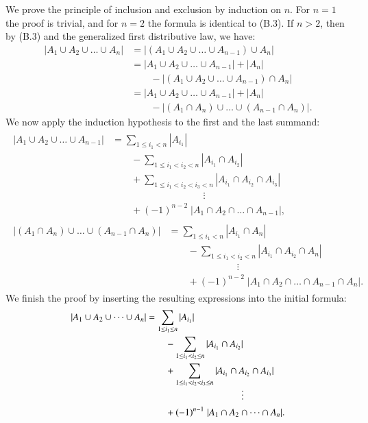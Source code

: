 \exercise
We prove the principle of inclusion and exclusion by induction on $n$.
For $n=1$ the proof is trivial, and for $n=2$ the formula is identical to (B.3).
If $n>2$, then by (B.3) and the generalized first distributive law, we have:
\begin{align*}
    |A_1\cup A_2\cup\dots\cup A_n| &= |(A_1\cup A_2\cup\dots\cup A_{n-1})\cup A_n| \\
    &= |A_1\cup A_2\cup\dots\cup A_{n-1}|+|A_n| \\
    &\qquad {}-|(A_1\cup A_2\cup\dots\cup A_{n-1})\cap A_n| \\
    &= |A_1\cup A_2\cup\dots\cup A_{n-1}|+|A_n| \\
    &\qquad {}-|(A_1\cap A_n)\cup\dots\cup(A_{n-1}\cap A_n)|.
\end{align*}
We now apply the induction hypothesis to the first and the last summand:
\begin{gather*}
    \begin{align*}
        |A_1\cup A_2\cup\dots\cup A_{n-1}| &= \sum_{1\le i_1<n}|A_{i_1}| \\
        &\qquad {}-\sum_{1\le i_1<i_2<n}|A_{i_1}\cap A_{i_2}| \\
        &\qquad {}+\sum_{1\le i_1<i_2<i_3<n}|A_{i_1}\cap A_{i_2}\cap A_{i_3}| \\[-2mm]
        &\hspace{4cm}\vdots \\
        &\qquad {}+(-1)^{n-2}\;|A_1\cap A_2\cap\dots\cap A_{n-1}|,
    \end{align*}\\[5mm]
    \begin{align*}
        |(A_1\cap A_n)\cup\dots\cup(A_{n-1}\cap A_n)| &= \sum_{1\le i_1<n}|A_{i_1}\cap A_n| \\
        &\qquad {}-\sum_{1\le i_1<i_2<n}|A_{i_1}\cap A_{i_2}\cap A_n| \\[-2mm]
        &\hspace{3cm}\vdots \\
        &\qquad {}+(-1)^{n-2}\;|A_1\cap A_2\cap\dots\cap A_{n-1}\cap A_n|.
    \end{align*}
\end{gather*}
We finish the proof by inserting the resulting expressions into the initial formula:
\begin{align*}
    |A_1\cup A_2\cup\dots\cup A_n| &= \sum_{1\le i_1\le n}|A_{i_1}| \\
    &\qquad {}-\sum_{1\le i_1<i_2\le n}|A_{i_1}\cap A_{i_2}| \\
    &\qquad {}+\sum_{1\le i_1<i_2<i_3\le n}|A_{i_1}\cap A_{i_2}\cap A_{i_3}| \\[-2mm]
    &\hspace{3.5cm}\vdots \\
    &\qquad {}+(-1)^{n-1}\;|A_1\cap A_2\cap\dots\cap A_n|.
\end{align*}

